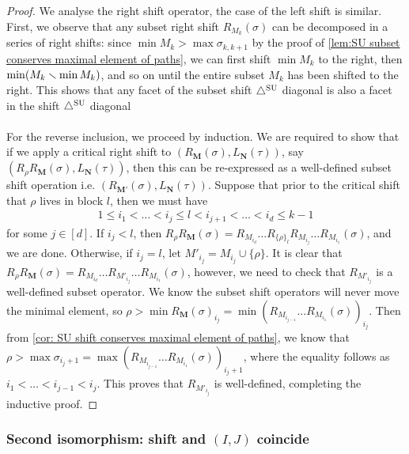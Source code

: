 \begin{proof}
We analyse the right shift operator, the case of the left shift is similar. 
First, we observe that any subset right shift $R_{M_k}(\sigma)$ can be decomposed in a series of right shifts: since $\min M_k > \max \sigma_{k,k+1}$ by the proof of \cref{lem:SU subset conserves maximal element of paths}, we can first shift $\min M_k$ to the right, then $\min (M_k \smallsetminus \min M_k)$, and so on until the entire subset $M_k$ has been shifted to the right. 
This shows that any facet of the subset shift $\triangle^{\mathrm{SU}}$ diagonal is also a facet in the shift $\triangle^{\mathrm{SU}}$ diagonal
\\\\
For the reverse inclusion, we proceed by induction. We are required to show that if we apply a critical right shift to $(R_{\mathbf{M}}(\sigma),L_{\mathbf{N}}(\tau))$, say $(R_{\rho}R_{\mathbf{M}}(\sigma),L_{\mathbf{N}}(\tau))$, then this can be re-expressed as a well-defined subset shift operation i.e. $(R_{\mathbf{M'}}(\sigma),L_{\mathbf{N}}(\tau))$. Suppose that prior to the critical shift that $\rho$ lives in block $l$, then we must have
\begin{align*}
    1 \leq i_1 < \dots < i_j \leq l < i_{j+1} <\dots< i_d \leq k-1
\end{align*}
for some $j\in [d]$. If $i_j < l$, then $R_{\rho}R_{\mathbf{M}}(\sigma) = R_{M_{i_d}}\dots R_{\{\rho\}_{l}}R_{M_{i_j}}\dots R_{M_{i_1}}(\sigma)$, and we are done.
Otherwise, if $i_j = l$, let $M'_{i_j} = M_{i_j} \cup \{\rho \}$. It is clear that $R_{\rho}R_{\mathbf{M}}(\sigma) = R_{M_{i_d}}\dots R_{M'_{i_j}}\dots R_{M_{i_1}}(\sigma)$, however, we need to check that $R_{M'_{i_j}}$ is a well-defined subset operator. 
We know the subset shift operators will never move the minimal element, so $\rho > \min R_{\mathbf{M}}(\sigma)_{i_j}= \min (R_{M_{i_{j-1}}}\dots R_{M_{i_1}}(\sigma))_{i_j}$.
Then from \cref{cor: SU shift conserves maximal element of paths}, we know that $\rho>\max \sigma_{i_j+1} = \max (R_{M_{i_{j-1}}}\dots R_{M_{i_1}}(\sigma))_{i_j + 1}$, where the equality follows as $i_1<\dots<i_{j-1}<i_j$. This proves that $R_{M'_{i_j}}$ is well-defined, completing the inductive proof.
\end{proof}


\subsubsection{Second isomorphism: shift and $(I,J)$ coincide}

